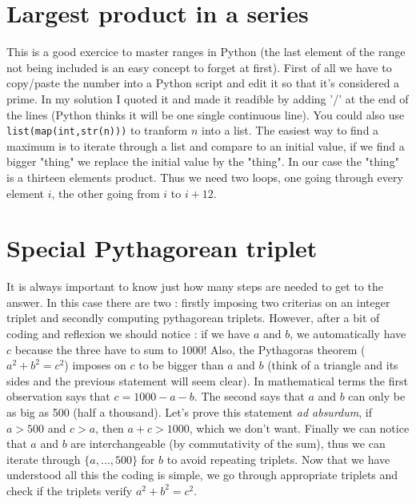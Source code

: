 \documentclass[11pt]{article}
\begin{document}
\section{Largest product in a series}
This is a good exercice to master ranges in Python (the last element of the range not being included is an easy concept to forget at first). First of all we have to copy/paste the number into a Python script and edit it so that it's considered a prime. In my solution I quoted it and made it readible by adding '/' at the end of the lines (Python thinks it will be one single continuous line). You could also use \texttt{list(map(int,str(n)))} to tranform $n$ into a list. The easiest way to find a maximum is to iterate through a list and compare to an initial value, if we find a bigger "thing" we replace the initial value by the "thing". In our case the "thing" is a thirteen elements product. Thus we need two loops, one going through every element $i$, the other going from $i$ to $i+12$.

\section{Special Pythagorean triplet}
It is always important to know just how many steps are needed to get to the answer. In this case there are two : firstly imposing two criterias on an integer triplet and secondly computing pythagorean triplets. However, after a bit of coding and reflexion we should notice : if we have $a$ and $b$, we automatically have $c$ because the three have to sum to 1000! Also, the Pythagoras theorem ($a^{2}+b^{2}=c^{2}$) imposes on $c$ to be bigger than $a$ and $b$ (think of a triangle and its sides and the previous statement will seem clear). In mathematical terms the first observation says that $c=1000-a-b$. The second says that $a$ and $b$ can only be as big as 500 (half a thousand). Let's prove this statement \emph{ad absurdum}, if $a > 500$ and $c > a$, then $a+c>1000$, which we don't want. Finally we can notice that $a$ and $b$ are interchangeable (by commutativity of the sum), thus we can iterate through $\{a,\dots,500\}$ for $b$ to avoid repeating triplets. Now that we have understood all this the coding is simple, we go through appropriate triplets and check if the triplets verify $a^{2}+b^{2}=c^{2}$.
\end{document}
